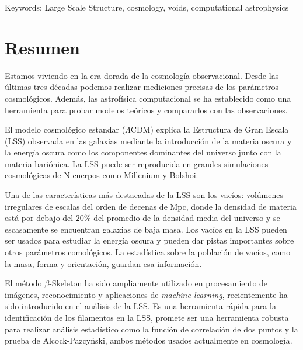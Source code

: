 \documentclass[manuscript]{aastex62}
\begin{document}
  

  \medskip

  Keywords: Large Scale Structure, cosmology, voids, computational astrophysics

  

  \section*{Resumen}

  Estamos viviendo en la era dorada de la cosmolog\'ia observacional.
  Desde las \'ultimas tres d\'ecadas podemos realizar mediciones precisas
  de los par\'ametros cosmol\'ogicos. Adem\'as,
  las astrof\'isica computacional se ha establecido como una herramienta para probar
  modelos te\'oricos y compararlos con las observaciones.

  El modelo cosmol\'ogico estandar ($\Lambda$CDM) explica la Estructura de Gran
  Escala (LSS) observada en las galaxias mediante la introducci\'on de la materia
  oscura y la energ\'ia oscura como los componentes dominantes del universo
  junto con la materia bari\'onica. La LSS puede ser reproducida en grandes
  simulaciones cosmol\'ogicas de N-cuerpos como Millenium y Bolshoi.

  Una de las caracter\'isticas m\'as destacadas de la LSS son los vac\'ios:
  vol\'umenes irregulares de escalas del orden de decenas de Mpc, donde la
  densidad de materia est\'a por debajo del $20\%$ del promedio de la densidad
  media del universo y se escasamente se encuentran galaxias de baja masa.
  Los vac\'ios en la LSS pueden ser usados para estudiar la energ\'ia oscura y pueden dar
  pistas importantes sobre otros par\'ametros comol\'ogicos.
  La estad\'istica sobre la poblaci\'on de vac\'ios, como la masa,
  forma y orientaci\'on, guardan esa informaci\'on.

  El m\'etodo $\beta$-Skeleton ha sido ampliamente utilizado en procesamiento
  de im\'agenes, reconocimiento y aplicaciones de \textit{machine learning},
  recientemente ha sido introducido en el an\'alisis de la LSS.
  Es una herramienta r\'apida para la identificaci\'on de los filamentos
  en la LSS, promete ser una herramienta robusta para realizar an\'alisis
  estad\'istico como la funci\'on de correlaci\'on de dos puntos y
  la prueba de Alcock-Pazcy\'nski, ambos  m\'etodos usados actualmente en
  cosmolog\'ia.
\end{document}
